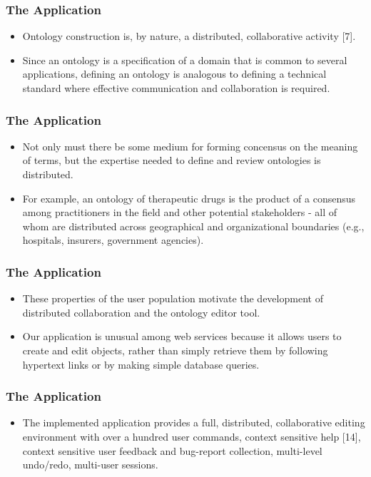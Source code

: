 \documentclass{beamer}
\begin{document}
\begin{frame}
\frametitle{The Application}

\begin{itemize}
\item Ontology construction is, by nature, a distributed, collaborative activity [7].
\item Since an ontology is a specification of a domain that is common to several applications, defining an ontology is analogous to defining a technical standard where effective communication and collaboration is required.
\end{itemize}

\end{frame}

\begin{frame}
\frametitle{The Application}

\begin{itemize}
\item Not only must there be some medium for forming concensus on the meaning of terms, but the expertise needed to define and review ontologies is distributed.
\item For example, an ontology of therapeutic drugs is the product of a consensus among practitioners in the field and other potential stakeholders - all of whom are distributed across geographical and organizational boundaries (e.g., hospitals, insurers, government agencies).
\end{itemize}

\end{frame}

\begin{frame}
\frametitle{The Application}

\begin{itemize}
\item These properties of the user population motivate the development of distributed collaboration and the ontology editor tool.
\item Our application is unusual among web services because it allows users to create and edit objects, rather than simply retrieve them by following hypertext links or by making simple database queries.
\end{itemize}

\end{frame}

\begin{frame}
\frametitle{The Application}

\begin{itemize}
\item The implemented application provides a full, distributed, collaborative editing environment with over a hundred user commands, context sensitive help [14], context sensitive user feedback and bug-report collection, multi-level undo/redo, multi-user sessions.
\end{itemize}

\end{frame}
\end{document}
